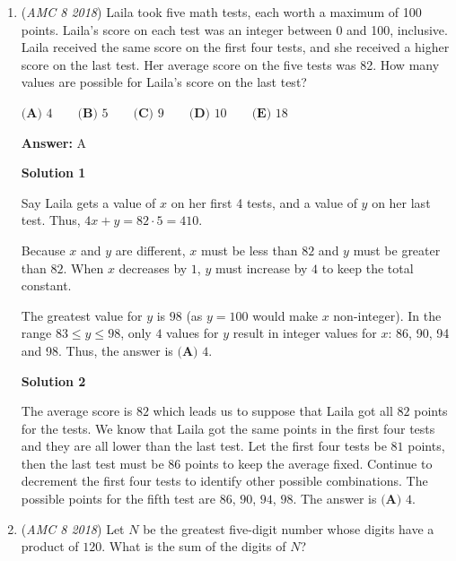 \begin{enumerate}
 5:00        | 5:50

 6:00        | 7:00

 As you can see, the answer is $\boxed{\textbf{(B) }6:00}$.~Evžen D.

 


	\item (\textit{AMC 8 2018}) Laila took five math tests, each worth a maximum of 100 points. Laila's score on each test was an integer between 0 and 100, inclusive. Laila received the same score on the first four tests, and she received a higher score on the last test. Her average score on the five tests was 82. How many values are possible for Laila's score on the last test?


 $\textbf{(A) }4\qquad\textbf{(B) }5\qquad\textbf{(C) }9\qquad\textbf{(D) }10\qquad \textbf{(E) }18$

 \textbf{Answer: }A



\textbf{Solution 1}

Say Laila gets a value of $x$ on her first 4 tests, and a value of $y$ on her last test. Thus, $4x+y=82 \cdot 5=410$. 

 Because $x$ and $y$ are different, $x$ must be less than $82$ and $y$ must be greater than $82$. When $x$ decreases by $1$, $y$ must increase by $4$ to keep the total constant. 

 The greatest value for $y$ is $98$ (as $y=100$ would make $x$ non-integer). In the range $83\le y\le 98$, only $4$ values for $y$ result in integer values for $x$: 86, 90, 94 and 98.  Thus, the answer is $\boxed{\textbf{(A) }4}$.

 



\textbf{Solution 2}

The average score is $82$ which leads us to suppose that Laila got all $82$ points for the tests. We know that Laila got the same points in the first four tests and they are all lower than the last test. Let the first four tests be $81$ points, then the last test must be $86$ points to keep the average fixed. Continue to decrement the first four tests to identify other possible combinations. The possible points for the fifth test are $86$, $90$, $94$, $98$. The answer is $\boxed{\textbf{(A) }4}$.

 


	\item (\textit{AMC 8 2018}) Let $N$ be the greatest five-digit number whose digits have a product of $120$. What is the sum of the digits of $N$?



\end{enumerate}
